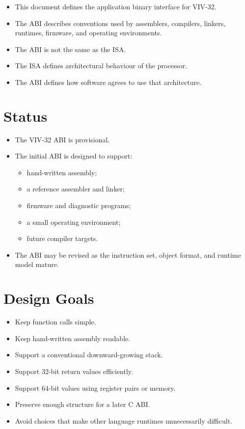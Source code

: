 \begin{itemize}
  \item This document defines the application binary interface for VIV-32.
  \item The ABI describes conventions used by assemblers, compilers, linkers, runtimes, firmware, and operating environments.
  \item The ABI is not the same as the ISA.
  \item The ISA defines architectural behaviour of the processor.
  \item The ABI defines how software agrees to use that architecture.
\end{itemize}

\section{Status}

\begin{itemize}
  \item The VIV-32 ABI is provisional.
  \item The initial ABI is designed to support:
  \begin{itemize}
    \item hand-written assembly;
    \item a reference assembler and linker;
    \item firmware and diagnostic programs;
    \item a small operating environment;
    \item future compiler targets.
  \end{itemize}
  \item The ABI may be revised as the instruction set, object format, and runtime model mature.
\end{itemize}

\section{Design Goals}

\begin{itemize}
  \item Keep function calls simple.
  \item Keep hand-written assembly readable.
  \item Support a conventional downward-growing stack.
  \item Support 32-bit return values efficiently.
  \item Support 64-bit values using register pairs or memory.
  \item Preserve enough structure for a later C ABI.
  \item Avoid choices that make other language runtimes unnecessarily difficult.
\end{itemize}
